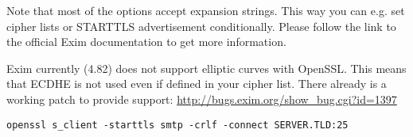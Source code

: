 Note that most of the options accept expansion strings. This way you can e.g. set cipher lists or STARTTLS advertisement conditionally. Please follow the link to the official Exim documentation to get more information.

Exim currently (4.82) does not support elliptic curves with OpenSSL. This means that ECDHE is not used even if defined in your cipher list.
There already is a working patch to provide support:
\url{http://bugs.exim.org/show_bug.cgi?id=1397}

\begin{lstlisting}
openssl s_client -starttls smtp -crlf -connect SERVER.TLD:25
\end{lstlisting}




